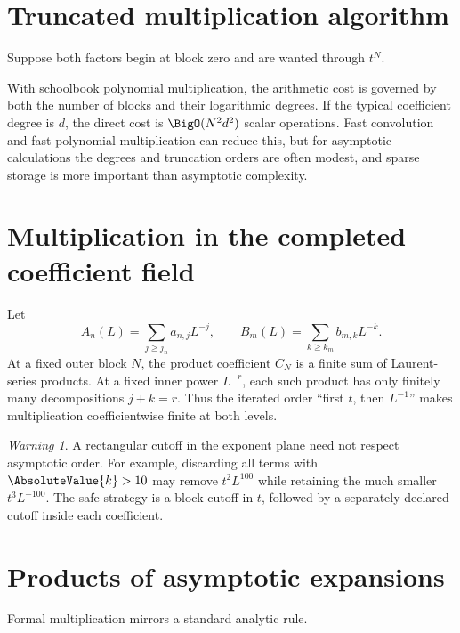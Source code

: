 \documentclass[11pt,oneside]{book}
\theoremstyle{definition}
\theoremstyle{remark}
\newtheorem{warning}[theorem]{Warning}
\newcommand{\trunc}[2]{\left[#1\right]_{\le #2}}
\begin{document}
\section{Truncated multiplication algorithm}
Suppose both factors begin at block zero and are wanted through $t^N$.

\begin{algorithm}[H]
\caption{Truncated polynomial--logarithmic product}
\label{alg:pl-product}
\KwOut{Blocks $C_0,\ldots,C_N$ of $\trunc{FG}{N}$}
\;
\end{algorithm}

With schoolbook polynomial multiplication, the arithmetic cost is governed by
both the number of blocks and their logarithmic degrees.  If the typical
coefficient degree is $d$, the direct cost is $\BigO(N^2d^2)$ scalar operations.
Fast convolution and fast polynomial multiplication can reduce this, but for
asymptotic calculations the degrees and truncation orders are often modest,
and sparse storage is more important than asymptotic complexity.

\section{Multiplication in the completed coefficient field}
Let
\[
 A_n(L)=\sum_{j\ge j_n}a_{n,j}L^{-j},
 \qquad
 B_m(L)=\sum_{k\ge k_m}b_{m,k}L^{-k}.
\]
At a fixed outer block $N$, the product coefficient $C_N$ is a finite sum of
Laurent-series products.  At a fixed inner power $L^{-r}$, each such product
has only finitely many decompositions $j+k=r$.  Thus the iterated order
``first $t$, then $L^{-1}$'' makes multiplication coefficientwise finite at
both levels.

\begin{warning}
A rectangular cutoff in the exponent plane need not respect asymptotic order.
For example, discarding all terms with $\AbsoluteValue{k}>10$ may remove
$t^2L^{100}$ while
retaining the much smaller $t^3L^{-100}$.  The safe strategy is a block cutoff
in $t$, followed by a separately declared cutoff inside each coefficient.
\end{warning}

\section{Products of asymptotic expansions}
Formal multiplication mirrors a standard analytic rule.
\end{document}
